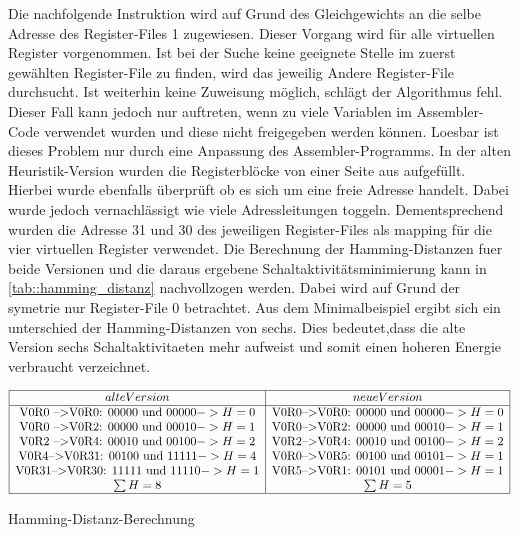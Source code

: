 Die nachfolgende Instruktion wird auf Grund des Gleichgewichts an die selbe Adresse des Register-Files 1 zugewiesen. Dieser Vorgang wird für alle virtuellen Register vorgenommen. Ist bei der Suche keine geeignete Stelle im zuerst gewählten Register-File zu finden, wird das jeweilig Andere Register-File durchsucht. Ist weiterhin keine Zuweisung möglich, schlägt der Algorithmus fehl. Dieser Fall kann jedoch nur auftreten, wenn zu viele Variablen im Assembler-Code verwendet wurden und diese nicht freigegeben werden können. Loesbar ist dieses Problem nur durch eine Anpassung des Assembler-Programms.
In der alten Heuristik-Version wurden die Registerblöcke von einer Seite aus aufgefüllt. Hierbei wurde ebenfalls überprüft ob es sich um eine freie Adresse handelt. Dabei wurde jedoch vernachlässigt wie viele Adressleitungen toggeln. Dementsprechend wurden die Adresse 31 und 30 des jeweiligen Register-Files als mapping für die vier virtuellen Register verwendet.
Die Berechnung der Hamming-Distanzen fuer beide Versionen und die daraus ergebene Schaltaktivitätsminimierung kann in \ref{tab::hamming_distanz} nachvollzogen werden. Dabei wird auf Grund der symetrie nur Register-File 0 betrachtet.
Aus dem Minimalbeispiel ergibt sich ein unterschied der Hamming-Distanzen von sechs. Dies bedeutet,dass die alte Version sechs Schaltaktivitaeten mehr aufweist und somit einen hoheren Energie verbraucht verzeichnet.

\begin{table}
	\centering
	$ \begin{array}{|c|c|}
	\hline
	alte Version & neue Version \\
	\hline
\text{V0R0 -->V0R0: } 00000 \text{ und } 00000 -> H= 0 &\text{V0R0-->V0R0: } 00000 \text{ und } 00000 -> H= 0\\
\text{V0R0 -->V0R2: } 00000 \text{ und } 00010 -> H= 1 &\text{V0R0-->V0R2: } 00000 \text{ und } 00010 -> H= 1 \\
\text{V0R2 -->V0R4: } 00010 \text{ und } 00100 -> H= 2 &\text{V0R2-->V0R4: } 00010 \text{ und } 00100 -> H= 2 \\
\text{V0R4-->V0R31: } 00100 \text{ und } 11111 -> H= 4 &\text{V0R0-->V0R5: } 00100 \text{ und } 00101 -> H= 1 \\
\text{V0R31-->V0R30: } 11111 \text{ und } 11110 -> H= 1 &\text{V0R5-->V0R1: } 00101 \text{ und } 00001 -> H= 1 \\
	\sum H=8 &\sum H=5 \\
	\hline
	\end{array} $
	\caption{Hamming-Distanz-Berechnung}
	\label{tab::hamming_distanz}
\end{table}

